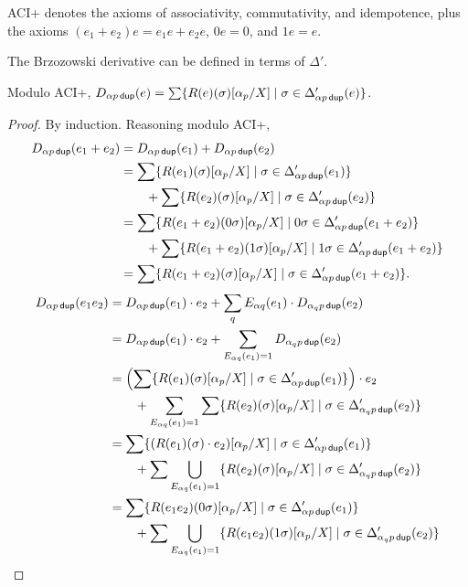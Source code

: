 \documentclass{article}
\newcommand\pdup{\mathop{\mathsf{dup}}}
\begin{document}
ACI+ denotes the axioms of associativity, commutativity, and idempotence, plus the axioms $(e_1+e_2)e = e_1e + e_2e$, $0e = 0$, and $1e = e$.

The Brzozowski derivative can be defined in terms of $\Delta'$.

\begin{lemma}
\label{eq:ABDelta}
Modulo ACI+, $D_{\alpha p\pdup}(e) = \sum\set{\rep\sigma e\subst{\alpha_p}X}{\sigma\in\Delta'_{\alpha p\pdup}(e)}$.
\end{lemma}
\begin{proof}
By induction. Reasoning modulo ACI+,
\begin{align*}
D_{\alpha p\pdup}(e_1+e_2) &= D_{\alpha p\pdup}(e_1) + D_{\alpha p\pdup}(e_2)\\
&= \sum\set{\rep\sigma{e_1}\subst{\alpha_p}X}{\sigma\in\Delta'_{\alpha p\pdup}(e_1)}\\
& \qquad + \sum\set{\rep\sigma{e_2}\subst{\alpha_p}X}{\sigma\in\Delta'_{\alpha p\pdup}(e_2)}\\
&= \sum\set{\rep{0\sigma}{e_1+e_2}\subst{\alpha_p}X}{0\sigma\in\Delta'_{\alpha p\pdup}(e_1+e_2)}\\
& \qquad + \sum\set{\rep{1\sigma}{e_1+e_2}\subst{\alpha_p}X}{1\sigma\in\Delta'_{\alpha p\pdup}(e_1+e_2)}\\
&= \sum\set{\rep{\sigma}{e_1+e_2}\subst{\alpha_p}X}{\sigma\in\Delta'_{\alpha p\pdup}(e_1+e_2)}.
\end{align*}
\begin{align*}
D_{\alpha p\pdup}(e_1e_2) &= D_{\alpha p\pdup}(e_1)\cdot e_2 + \sum_q E_{\alpha q}(e_1)\cdot D_{\alpha_qp\pdup}(e_2)\\
&= D_{\alpha p\pdup}(e_1)\cdot e_2 + \sum_{E_{\alpha q}(e_1)=1} D_{\alpha_qp\pdup}(e_2)\\
&= \left(\sum\set{\rep\sigma{e_1}\subst{\alpha_p}X}{\sigma\in\Delta'_{\alpha p\pdup}(e_1)}\right)\cdot e_2\\
& \qquad + \sum_{E_{\alpha q}(e_1)=1}\sum\set{\rep\sigma{e_2}\subst{\alpha_p}X}{\sigma\in\Delta'_{\alpha_qp\pdup}(e_2)}\\
&= \sum\set{(\rep\sigma{e_1}\cdot e_2)\subst{\alpha_p}X}{\sigma\in\Delta'_{\alpha p\pdup}(e_1)}\\
& \qquad + \sum\bigcup_{E_{\alpha q}(e_1)=1}\set{\rep\sigma{e_2}\subst{\alpha_p}X}{\sigma\in\Delta'_{\alpha_qp\pdup}(e_2)}\\
&= \sum\set{\rep{0\sigma}{e_1e_2}\subst{\alpha_p}X}{\sigma\in\Delta'_{\alpha p\pdup}(e_1)}\\
& \qquad + \sum\bigcup_{E_{\alpha q}(e_1)=1}\set{\rep{1\sigma}{e_1e_2}\subst{\alpha_p}X}{\sigma\in\Delta'_{\alpha_qp\pdup}(e_2)}\\

\end{align*}
\end{proof}
\end{document}
